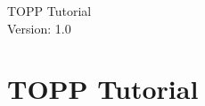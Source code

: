 \documentclass[a4paper]{article}
\begin{document}
\begin{titlepage}
\vspace*{7cm}
\begin{center}
{\Large TOPP Tutorial\\[1ex]\large Version: 1.0 }\\
\end{center}
\end{titlepage}


\setcounter{tocdepth}{2}
\tableofcontents
\pagebreak

\section{TOPP Tutorial}
	
	
	\pagebreak

	
	\pagebreak
	
	\pagebreak
	
	\pagebreak
	
	\pagebreak
	
	\pagebreak
	
	\pagebreak
\end{document}

